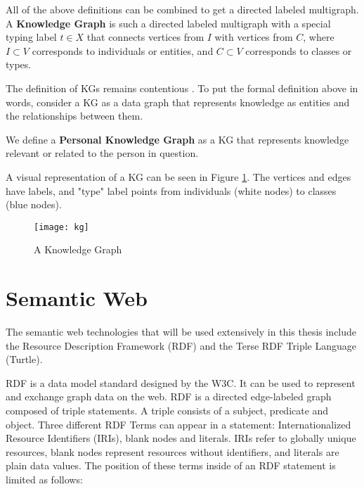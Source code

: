 \begin{definition}
    All of the above definitions can be combined to get a directed labeled multigraph.
    A \textbf{Knowledge Graph} is such a directed labeled multigraph with a special typing label $t \in X$ that connects vertices from $I$ with vertices from $C$, where $I \subset V$ corresponds to individuals or entities, and $C \subset V$ corresponds to classes or types.
\end{definition}


The definition of KGs remains contentious \cite{Hogan2021KG,commonsenseKG}. To put the formal definition above in words, consider a KG as a data graph that represents knowledge as entities and the relationships between them. 

We define a \textbf{Personal Knowledge Graph} as a KG that represents knowledge relevant or related to the person in question.

A visual representation of a KG can be seen in Figure \ref{fig:kg}. The vertices and edges have labels, and "type" label points from individuals (white nodes) to classes (blue nodes).

\begin{figure}[H]
    \centering
    \texttt{[image: kg]}
    \caption[]{A Knowledge Graph}
    \label{fig:kg}
\end{figure}







\section{Semantic Web}

The semantic web technologies that will be used extensively in this thesis include the Resource Description Framework (RDF) and the Terse RDF Triple Language (Turtle).

RDF is a data model standard designed by the W3C. It can be used to represent and exchange graph data on the web. RDF is a directed edge-labeled graph composed of triple statements. A triple consists of a subject, predicate and object. Three different RDF Terms can appear in a statement: Internationalized Resource Identifiers (IRIs), blank nodes and literals. IRIs refer to globally unique resources, blank nodes represent resources without identifiers, and literals are plain data values. The position of these terms inside of an RDF statement is limited as follows:

